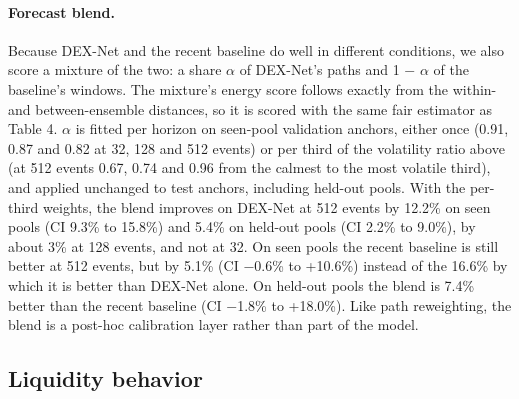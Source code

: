 \documentclass[11pt]{article}
\begin{document}
\paragraph{Forecast blend.} Because DEX-Net and the recent baseline do well in different conditions, we also score a mixture of the two: a share \ensuremath{\alpha} of DEX-Net's paths and 1 \ensuremath{-} \ensuremath{\alpha} of the baseline's windows. The mixture's energy score follows exactly from the within- and between-ensemble distances, so it is scored with the same fair estimator as Table 4. \ensuremath{\alpha} is fitted per horizon on seen-pool validation anchors, either once (0.91, 0.87 and 0.82 at 32, 128 and 512 events) or per third of the volatility ratio above (at 512 events 0.67, 0.74 and 0.96 from the calmest to the most volatile third), and applied unchanged to test anchors, including held-out pools. With the per-third weights, the blend improves on DEX-Net at 512 events by 12.2\% on seen pools (CI 9.3\% to 15.8\%) and 5.4\% on held-out pools (CI 2.2\% to 9.0\%), by about 3\% at 128 events, and not at 32. On seen pools the recent baseline is still better at 512 events, but by 5.1\% (CI \ensuremath{-}0.6\% to +10.6\%) instead of the 16.6\% by which it is better than DEX-Net alone. On held-out pools the blend is 7.4\% better than the recent baseline (CI \ensuremath{-}1.8\% to +18.0\%). Like path reweighting, the blend is a post-hoc calibration layer rather than part of the model.

\subsection{Liquidity behavior}
\end{document}
